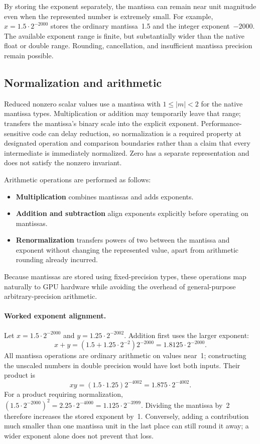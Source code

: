 By storing the exponent separately, the mantissa can remain near unit magnitude
even when the represented number is extremely small. For example,
$x=1.5\cdot2^{-2000}$ stores the ordinary mantissa~1.5 and the integer
exponent~$-2000$. The available exponent range is finite, but substantially wider
than the native float or double range. Rounding, cancellation, and insufficient
mantissa precision remain possible.

\subsection{Normalization and arithmetic}

Reduced nonzero scalar values use a mantissa with $1\le |m|<2$ for the native
mantissa types. Multiplication or addition may temporarily leave that range;
 transfers the mantissa's binary scale into the explicit
exponent. Performance-sensitive code can delay reduction, so normalization is
a required property at designated operation and comparison boundaries rather
than a claim that every intermediate is immediately normalized. Zero has a
separate representation and does not satisfy the nonzero invariant.

Arithmetic operations are performed as follows:
\begin{itemize}
\item \textbf{Multiplication} combines mantissas and adds exponents.
\item \textbf{Addition and subtraction} align exponents explicitly before
      operating on mantissas.
\item \textbf{Renormalization} transfers powers of two between the mantissa and
      exponent without changing the represented value, apart from arithmetic
      rounding already incurred.
\end{itemize}

Because mantissas are stored using fixed-precision types, these operations map
naturally to GPU hardware while avoiding the overhead of general-purpose
arbitrary-precision arithmetic.

\paragraph{Worked exponent alignment.}
Let $x=1.5\cdot2^{-2000}$ and $y=1.25\cdot2^{-2002}$. Addition first uses the
larger exponent:
\[
x+y=(1.5+1.25\cdot2^{-2})2^{-2000}
    =1.8125\cdot2^{-2000}.
\]
All mantissa operations are ordinary arithmetic on values near~1; constructing
the unscaled numbers in double precision would have lost both inputs. Their
product is
\[
xy=(1.5\cdot1.25)2^{-4002}=1.875\cdot2^{-4002}.
\]
For a product requiring normalization,
$(1.5\cdot2^{-2000})^2=2.25\cdot2^{-4000}
=1.125\cdot2^{-3999}$. Dividing the mantissa by~2 therefore increases the
stored exponent by~1. Conversely, adding a contribution much smaller than one
mantissa unit in the last place can still round it away; a wider exponent alone
does not prevent that loss.

